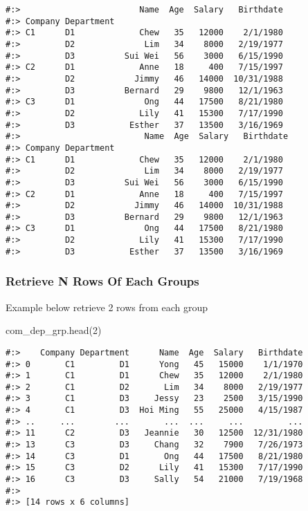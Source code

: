 \documentclass[
]{book}
\newenvironment{Shaded}{\begin{snugshade}}{\end{snugshade}}
\newcommand{\DecValTok}[1]{\textcolor[rgb]{0.06,0.06,0.06}{#1}}
\newcommand{\NormalTok}[1]{#1}
\begin{document}
\begin{verbatim}
#:>                        Name  Age  Salary   Birthdate
#:> Company Department                                  
#:> C1      D1             Chew   35   12000    2/1/1980
#:>         D2              Lim   34    8000   2/19/1977
#:>         D3          Sui Wei   56    3000   6/15/1990
#:> C2      D1             Anne   18     400   7/15/1997
#:>         D2            Jimmy   46   14000  10/31/1988
#:>         D3          Bernard   29    9800   12/1/1963
#:> C3      D1              Ong   44   17500   8/21/1980
#:>         D2             Lily   41   15300   7/17/1990
#:>         D3           Esther   37   13500   3/16/1969 
#:>                         Name  Age  Salary   Birthdate
#:> Company Department                                  
#:> C1      D1             Chew   35   12000    2/1/1980
#:>         D2              Lim   34    8000   2/19/1977
#:>         D3          Sui Wei   56    3000   6/15/1990
#:> C2      D1             Anne   18     400   7/15/1997
#:>         D2            Jimmy   46   14000  10/31/1988
#:>         D3          Bernard   29    9800   12/1/1963
#:> C3      D1              Ong   44   17500   8/21/1980
#:>         D2             Lily   41   15300   7/17/1990
#:>         D3           Esther   37   13500   3/16/1969
\end{verbatim}

\hypertarget{retrieve-n-rows-of-each-groups}{%
\subsubsection{Retrieve N Rows Of Each Groups}\label{retrieve-n-rows-of-each-groups}}

Example below retrieve 2 rows from each group

\begin{Shaded}
\begin{Highlighting}[]
\NormalTok{com\_dep\_grp.head(}\DecValTok{2}\NormalTok{)}
\end{Highlighting}
\end{Shaded}

\begin{verbatim}
#:>    Company Department      Name  Age  Salary   Birthdate
#:> 0       C1         D1      Yong   45   15000    1/1/1970
#:> 1       C1         D1      Chew   35   12000    2/1/1980
#:> 2       C1         D2       Lim   34    8000   2/19/1977
#:> 3       C1         D3     Jessy   23    2500   3/15/1990
#:> 4       C1         D3  Hoi Ming   55   25000   4/15/1987
#:> ..     ...        ...       ...  ...     ...         ...
#:> 11      C2         D3   Jeannie   30   12500  12/31/1980
#:> 13      C3         D3     Chang   32    7900   7/26/1973
#:> 14      C3         D1       Ong   44   17500   8/21/1980
#:> 15      C3         D2      Lily   41   15300   7/17/1990
#:> 16      C3         D3     Sally   54   21000   7/19/1968
#:> 
#:> [14 rows x 6 columns]
\end{verbatim}
\end{document}
